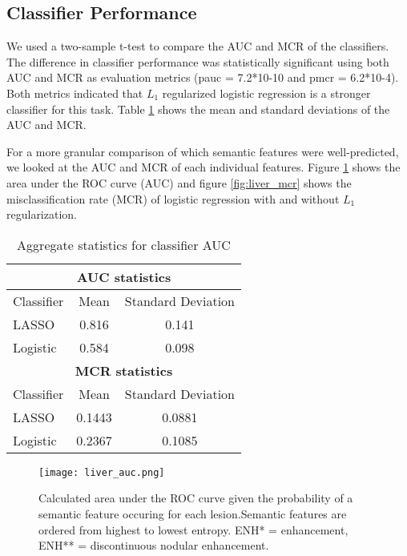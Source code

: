 \subsection{Classifier Performance}

We used a two-sample t-test to compare the AUC and MCR of the classifiers. The difference in classifier performance was statistically significant using both AUC and MCR as evaluation metrics (pauc = 7.2*10-10 and pmcr = 6.2*10-4). Both metrics indicated that $L_1$ regularized logistic regression is a stronger classifier for this task. Table \ref{table:liver_auc_mcr} shows the mean and standard deviations of the AUC and MCR.

For a more granular comparison of which semantic features were well-predicted, we looked at the AUC and MCR of each individual features. Figure \ref{fig:liver_auc} shows the area under the ROC curve (AUC) and figure \ref{fig:liver_mcr} shows the misclassification rate (MCR) of logistic regression with and without $L_1$ regularization.

\begin{table}[h!]
	\centering
	\begin{tabular}{|l|c|c|}
		\hline
		\multicolumn{3}{|c|}{\textbf{AUC statistics}} \\ \hline
		Classifier & Mean & Standard Deviation\\ 
		\hline
		LASSO & 0.816 & 0.141 \\ 
		\hline 
		Logistic & 0.584 & 0.098 \\ 
		\hline \hline
		\multicolumn{3}{|c|}{\textbf{MCR statistics} }\\ 
		\hline
		Classifier & Mean & Standard Deviation\\ 
		\hline
		LASSO & 0.1443 & 0.0881 \\ 
		\hline 
		Logistic & 0.2367 & 0.1085 \\ 
		\hline 
	\end{tabular}
	\caption{Aggregate statistics for classifier AUC}
	\label{table:liver_auc_mcr}
\end{table}


\begin{figure}
	\centering
	\texttt{[image: liver\_auc.png]}
	\caption[AUC results for liver annotation]{Calculated area under the ROC curve given the probability of a semantic feature occuring for each lesion.Semantic features are ordered from highest to lowest entropy. ENH* = enhancement, ENH** = discontinuous nodular enhancement.}
	\label{fig:liver_auc}
\end{figure}


